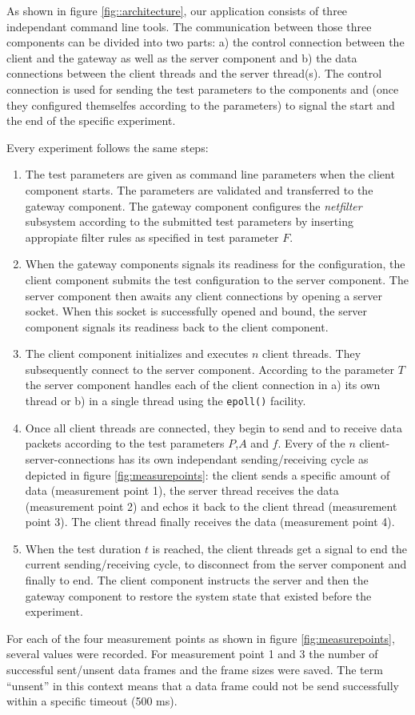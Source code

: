 \documentclass{sig-alternate}
\begin{document}
\noindent As shown in figure \ref{fig::architecture}, our application consists 
of three independant command line tools. The communication between those three 
components can be divided into two parts: a) the control connection between the 
client and the gateway as well as the server component and b) the data 
connections between the client threads and the server thread(s). The control 
connection is used for sending the test parameters to the components and 
(once they configured themselfes according to the parameters) to signal the 
start and the end of the specific experiment.

\noindent Every experiment follows the same steps:
\begin{enumerate}
\item The test parameters are given as command line pa\-ra\-me\-ters when the 
client component starts. The parameters are validated and transferred to the 
gateway component. The gateway component configures the \emph{netfilter} 
subsystem according to the submitted test parameters by inserting appropiate 
filter rules as specified in test parameter $F$.
\item When the gateway components signals its readiness for the configuration, 
the client component submits the test configuration to the server component. 
The server component then awaits any client connections by opening a server 
socket. When this socket is successfully opened and bound, the server component
signals its readiness back to the client component.
\item The client component initializes and executes $n$ client threads. They
subsequently connect to the server component. According to the parameter $T$ 
the server component handles each of the client connection in a) its own thread 
or b) in a single thread using the \texttt{epoll()} facility.
\item Once all client threads are connected, they begin to send and to receive 
data packets according to the test parameters $P$,$A$ and $f$. Every of the $n$ 
client-server-connections has its own independant sending/receiving cycle as 
depicted in fi\-gu\-re \ref{fig:measurepoints}: the client sends a specific 
amount of data (measurement point 1), the server thread receives the data 
(measurement point 2) and echos it back to the client thread (measurement point 
3). The client thread finally receives the data (measurement point 4).
\item When the test duration $t$ is reached, the client threads get a signal to 
end the current sending/re\-cei\-ving cycle, to disconnect from the server 
component and finally to end. The client component instructs the server and 
then the gateway component to restore the system state that existed before the 
ex\-pe\-ri\-ment.
\end{enumerate}
For each of the four measurement points as shown in fi\-gu\-re
\ref{fig:measurepoints}, several values were recorded. For measurement point 1
and 3 the number of successful sent/unsent data frames and the frame sizes were
saved. The term ``unsent'' in this context means that a data frame could not be
send successfully within a specific timeout (500 ms).
\end{document}
